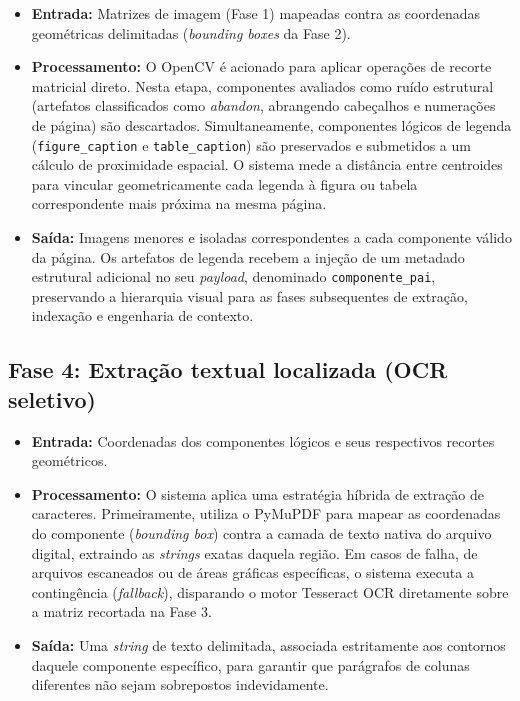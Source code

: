 \begin{itemize}
    \item \textbf{Entrada:} Matrizes de imagem (Fase 1) mapeadas contra as coordenadas geométricas delimitadas (\textit{bounding boxes} da Fase 2).
    \item \textbf{Processamento:} O OpenCV é acionado para aplicar operações de recorte matricial direto. Nesta etapa, componentes avaliados como ruído estrutural (artefatos classificados como \textit{abandon}, abrangendo cabeçalhos e numerações de página) são descartados. Simultaneamente, componentes lógicos de legenda (\texttt{figure\_caption} e \texttt{table\_caption}) são preservados e submetidos a um cálculo de proximidade espacial. O sistema mede a distância entre centroides para vincular geometricamente cada legenda à figura ou tabela correspondente mais próxima na mesma página.
    \item \textbf{Saída:} Imagens menores e isoladas correspondentes a cada componente válido da página. Os artefatos de legenda recebem a injeção de um metadado estrutural adicional no seu \textit{payload}, denominado \texttt{componente\_pai}, preservando a hierarquia visual para as fases subsequentes de extração, indexação e engenharia de contexto.
\end{itemize}

\subsection{Fase 4: Extração textual localizada (OCR seletivo)}
\label{subsec:fase4_ocr_localizado}

\begin{itemize}
    \item \textbf{Entrada:} Coordenadas dos componentes lógicos e seus respectivos recortes geométricos.
    \item \textbf{Processamento:} O sistema aplica uma estratégia híbrida de extração de caracteres. Primeiramente, utiliza o PyMuPDF para mapear as coordenadas do componente (\textit{bounding box}) contra a camada de texto nativa do arquivo digital, extraindo as \textit{strings} exatas daquela região. Em casos de falha, de arquivos escaneados ou de áreas gráficas específicas, o sistema executa a contingência (\textit{fallback}), disparando o motor Tesseract OCR diretamente sobre a matriz recortada na Fase 3.
    \item \textbf{Saída:} Uma \textit{string} de texto delimitada, associada estritamente aos contornos daquele componente específico, para garantir que parágrafos de colunas diferentes não sejam sobrepostos indevidamente.
\end{itemize}

